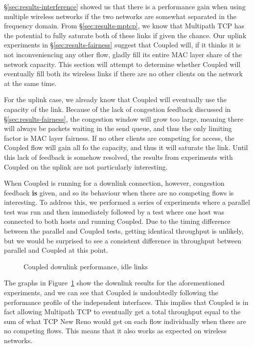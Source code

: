 \S\ref{sec:results-interference} showed us that there is a performance
gain when using multiple wireless networks if the two networks are somewhat 
separated in the frequency domain. From \S\ref{sec:results-mptcp}, we know that 
Multipath TCP has the potential to fully saturate both of these links if given 
the chance. Our uplink experiments in \S\ref{sec:results-fairness} suggest that 
Coupled will, if it thinks it is not inconveniencing any other flow, gladly fill 
its entire MAC layer share of the network capacity. This section will attempt to 
determine whether Coupled will eventually fill both its wireless links if there 
are no other clients on the network at the same time.

For the uplink case, we already know that Coupled will eventually use the
capacity of the link. Because of the lack of congestion feedback discussed in
\S\ref{sec:results-fairness}, the congestion window will grow too large,
meaning there will always be packets waiting in the send queue, and thus the
only limiting factor is MAC layer fairness. If no other clients are competing
for access, the Coupled flow will gain all fo the capacity, and thus it
will saturate the link. Until this lack of feedback is somehow resolved, the 
results from experiments with Coupled on the uplink are not particularly
interesting.

When Coupled is running for a downlink connection, however, congestion feedback
\textbf{is} given, and so its behaviour when there are no competing flows is 
interesting. To address this, we performed a series of 
experiments where a parallel test was run and then immediately followed by a 
test where one host was connected to both hosts and running Coupled. Due to the 
timing difference between the parallel and Coupled tests, getting identical 
throughput is unlikely, but we would be surprised to see a consistent difference 
in throughput between parallel and Coupled at this point.

\begin{figure}[h]
 \centering
 
 \caption{Coupled downlink performance, idle links}\label{graph:coupled-performance}
\end{figure}

The graphs in Figure~\ref{graph:coupled-performance} show the downlink results
for the aforementioned experiments, and we can see that Coupled is undoubtedly
following the performance profile of the independent interfaces. This implies
that Coupled is in fact allowing Multipath TCP to eventually get a total
throughput equal to the sum of what TCP New Reno would get on each flow
individually when there are no competing flows. This means that it also works as
expected on wireless networks.
